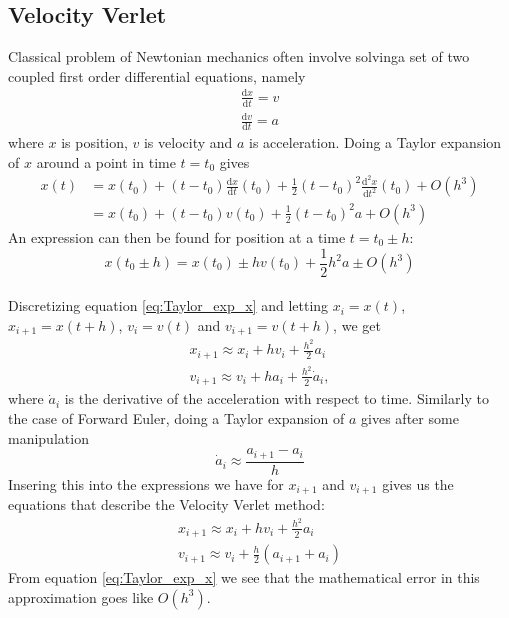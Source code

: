 \documentclass[reprint, english,notitlepage,nofootinbib]{revtex4-1}  %
\begin{document}
\subsection{Velocity Verlet}

Classical problem of Newtonian mechanics often involve solvinga set of two coupled first order differential equations, namely
\begin{align*}
  \frac{\mathrm d x}{\mathrm dt} = v \\
  \frac{\mathrm d v}{\mathrm dt} = a
\end{align*}
where $x$ is position, $v$ is velocity and $a$ is acceleration. Doing a Taylor expansion of $x$ around a point in time $t = t_0$ gives
\begin{align*}
  x(t) &= x(t_0) + (t - t_0) \frac{\mathrm d x}{\mathrm dt}(t_0) + \frac{1}{2} (t - t_0)^2 \frac{\mathrm d^2 x}{\mathrm dt^2}(t_0) + O(h^3) \\
  &= x(t_0) + (t - t_0) v(t_0) + \frac{1}{2} (t - t_0)^2 a + O(h^3)
\end{align*}
An expression can then be found for position at a time $t = t_0 \pm h$:
\begin{equation}
  \label{eq:Taylor_exp_x}
  x(t_0 \pm h) = x(t_0) \pm h v(t_0) + \frac{1}{2} h^2 a \pm O(h^3)
\end{equation}
\\
Discretizing equation \ref{eq:Taylor_exp_x} and letting $x_i = x(t)$, $x_{i+1} = x(t + h)$, $v_i = v(t)$ and $v_{i+1} = v(t + h)$, we get
\begin{align*}
  x_{i+1} \approx x_i + h v_i + \frac{h^2}{2} a_i \\
  v_{i+1} \approx v_i + h a_i + \frac{h^2}{2} \dot a_i,
\end{align*}
where $\dot a_i$ is the derivative of the acceleration with respect to time. Similarly to the case of Forward Euler, doing a Taylor expansion of $a$ gives after some manipulation
\begin{equation}
  \dot a_i \approx \frac{a_{i+1} - a_i}{h}
\end{equation}
Insering this into the expressions we have for $x_{i+1}$ and $v_{i+1}$ gives us the equations that describe the Velocity Verlet method:
\begin{align*}
  x_{i+1} \approx x_i + h v_i + \frac{h^2}{2} a_i \\
  v_{i+1} \approx v_i + \frac{h}{2} (a_{i+1} + a_i)
\end{align*}
From equation \ref{eq:Taylor_exp_x} we see that the mathematical error in this approximation goes like $O(h^3)$.
\end{document}
